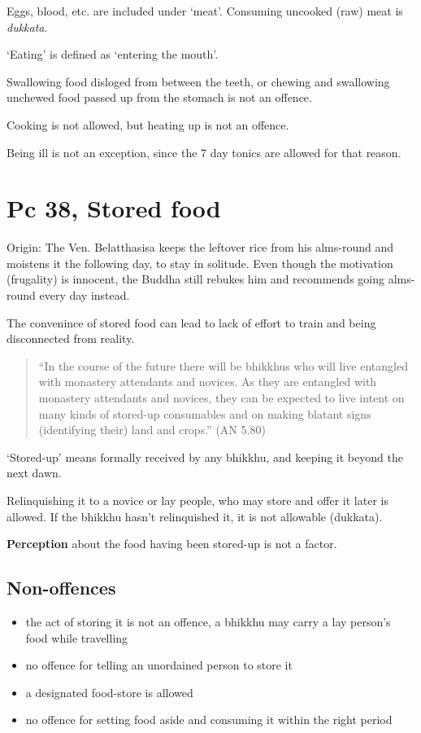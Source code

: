 Eggs, blood, etc. are included under `meat'. Consuming uncooked (raw)
meat is \emph{dukkata}.

`Eating' is defined as `entering the mouth'.

Swallowing food disloged from between the teeth, or chewing and
swallowing unchewed food passed up from the stomach is not an offence.

Cooking is not allowed, but heating up is not an offence.

Being ill is not an exception, since the 7 day tonics are allowed for
that reason.

\section{Pc 38, Stored food}

Origin: The Ven. Belatthasisa keeps the leftover rice from his
alms-round and moistens it the following day, to stay in solitude. Even
though the motivation (frugality) is innocent, the Buddha still rebukes
him and recommends going alms-round every day instead.

The convenince of stored food can lead to lack of effort to train and
being disconnected from reality.

\begin{quote}
``In the course of the future there will be bhikkhus who will live
entangled with monastery attendants and novices. As they are entangled
with monastery attendants and novices, they can be expected to live
intent on many kinds of stored-up consumables and on making blatant
signs (identifying their) land and crops.'' (AN 5.80)
\end{quote}

`Stored-up' means formally received by any bhikkhu, and keeping it
beyond the next dawn.

Relinquishing it to a novice or lay people, who may store and offer it
later is allowed. If the bhikkhu hasn't relinquished it, it is not
allowable (dukkata).

\textbf{Perception} about the food having been stored-up is not a
factor.

\clearpage

\subsection{Non-offences}

\begin{itemize}
\tightlist
\item
  the act of storing it is not an offence, a bhikkhu may carry a lay
  person's food while travelling
\item
  no offence for telling an unordained person to store it
\item
  a designated food-store is allowed
\item
  no offence for setting food aside and consuming it within the right
  period
\end{itemize}

